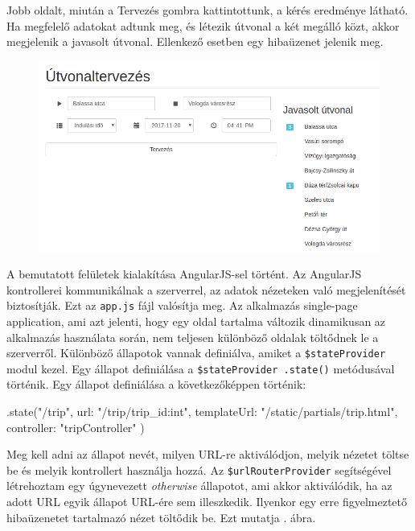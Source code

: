 Jobb oldalt, miután a Tervezés gombra kattintottunk, a kérés eredménye látható. Ha megfelelő adatokat adtunk meg, és létezik útvonal a két megálló közt, akkor megjelenik a javasolt útvonal. Ellenkező esetben egy hibaüzenet jelenik meg.

\begin{figure}[h!]
\centering
\includegraphics[scale=0.5]{kepek/trip_planner.png}
\caption{}
\label{fig:trip_planner}
\end{figure}


A bemutatott felületek kialakítása AngularJS-sel történt. Az AngularJS kontrollerei kommunikálnak a szerverrel, az adatok nézeteken való megjelenítését biztosítják. Ezt az \texttt{app.js} fájl valósítja meg.
Az alkalmazás single-page application, ami azt jelenti, hogy egy oldal tartalma változik dinamikusan az alkalmazás használata során, nem teljesen különböző oldalak töltődnek le a szerverről. Különböző állapotok vannak definiálva, amiket a \texttt{\$stateProvider} modul kezel. Egy állapot definiálása a \texttt{\$stateProvider .state()} metódusával történik.
Egy állapot definiálása a következőképpen történik:
\begin{cpp}
.state("/trip", {
            url: "/trip/{trip_id:int}",
            templateUrl: "/static/partials/trip.html",
            controller: "tripController"
        })
\end{cpp}
Meg kell adni az állapot nevét, milyen URL-re aktiválódjon, melyik nézetet töltse be és melyik kontrollert használja hozzá.
Az \texttt{\$urlRouterProvider} segítségével létrehoztam egy úgynevezett \textit{otherwise} állapotot, ami akkor aktiválódik, ha az adott URL egyik állapot URL-ére sem illeszkedik. Ilyenkor egy erre figyelmeztető hibaüzenetet tartalmazó nézet töltődik be. Ezt mutatja . ábra.

